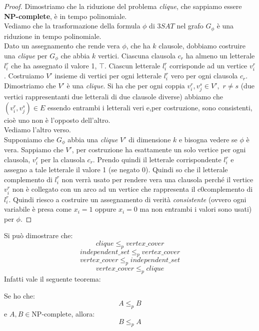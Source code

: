 										\begin{proof}
											Dimostriamo che la riduzione del problema \textit{clique}, che sappiamo essere
											\textbf{NP-complete}, è in tempo polinomiale.\\ 
											Vediamo che la trasformazione della formula $\phi$ di $3SAT$ nel grafo
											$G_\phi$ è una riduzione in tempo polinomiale.\\
											Dato un assegnamento che rende vera $\phi$, che ha $k$ clausole, dobbiamo
											costruire una \textit{clique} per $G_\phi$ che abbia $k$ vertici. Ciascuna
											clausola $c_{r}$ ha almeno un letterale $l_{i}^r$ che ha assegnato il valore 1,
											$\top$. Ciascun letterale $l_{i}^r$ corrisponde ad un vertice
											$v_{i}^r$. Costruiamo $V'$ insieme di vertici per ogni letterale $l_i^r$ vero
											per ogni clausola $c_r$. Dimostriamo che $V'$ è una \textit{clique}. Si ha che
											per ogni coppia $v_i^r,v_j^s\in V',\,\,r\neq s$ (due vertici rappresentanti
											due letterali di due clausole diverse) abbiamo che $(v_i^r,v_j^s)\in
											E$ essendo entrambi i letterali veri e,per costruzione, sono consistenti, cioè
											uno non è l'opposto dell'altro.\\
											Vediamo l'altro verso.\\
											Supponiamo che $G_\phi$ abbia una \textit{clique} $V'$ di dimensione $k$ e
											bisogna vedere se $\phi$ è vera. Sappiamo che $V'$, per costruzione ha
											esattamente un solo vertice per ogni clausola, $v_i^r$ per la clausola
											$c_r$. Prendo quindi il letterale corrispondente $l_i^r$ e assegno a tale
											letterale il valore 1 (se negato 0). Quindi so che il letterale complemento di
											$l_i^r$ non verrà usato per rendere vera una clausola perché il vertice
											$v_i^r$ non è collegato con un arco ad un vertice che rappresenta il
											c0complemento di $l_i^r$. Quindi riesco a costruire un assegnamento di verità
											\textit{consistente} (ovvero ogni variabile è presa come $x_i=1$ oppure
											$x_i=0$ ma non entrambi i valori sono usati) per $\phi$.
										\end{proof}
										Si può dimostrare che:
										\[clique\leq_p vertex\_cover\]
										\[independent\_set\leq_p vertex\_cover\]
										\[vertex\_cover\leq_p independent\_set\]
										\[vertex\_cover\leq_p clique\]
										Infatti vale il seguente teorema:
										\begin{teorema}
											Se ho che:
											\[A\leq_p B\]
											e $A,B\in \mbox{NP-complete}$, allora:
											\[B\leq_p A\]
										\end{teorema}

